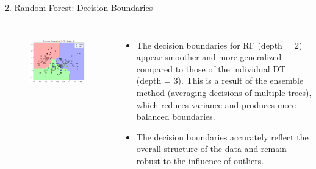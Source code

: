 \documentclass[aspectratio=169,xcolor=dvipsnames]{beamer}
\begin{document}
\begin{frame}{2. Random Forest: Decision Boundaries}

    \begin{columns}[c] %
        \begin{figure}
            \centering
            \includegraphics[width=1.15\linewidth]{out/plot11_RF_decision_boundaries.png}
            \label{fig:1}
        \end{figure}
        

        \begin{itemize}
            \item The decision boundaries for RF (depth = 2) appear smoother and more generalized compared 
            to those of the individual DT (depth = 3). This is a result of the ensemble method 
            (averaging decisions of multiple trees), which reduces variance and produces more balanced 
            boundaries.

            \item The decision boundaries accurately reflect the overall structure of the data and 
            remain robust to the influence of outliers.
        \end{itemize}

    \end{columns}

\end{frame}
\end{document}
